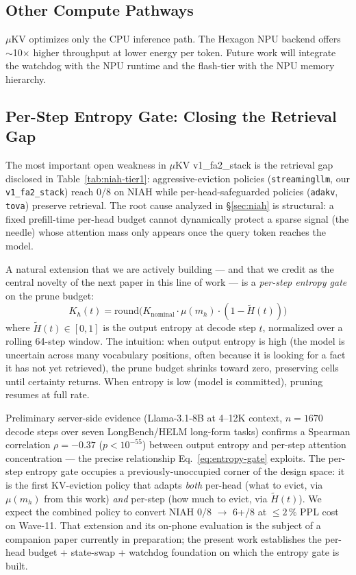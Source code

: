 \documentclass[sigconf, anonymous=false, screen=true]{acmart}
\begin{document}
\subsection{Other Compute Pathways}
\textsc{$\mu$KV} optimizes only the CPU inference path. The Hexagon NPU backend offers $\sim$10$\times$ higher throughput at lower energy per token. Future work will integrate the watchdog with the NPU runtime and the flash-tier with the NPU memory hierarchy.

\subsection{Per-Step Entropy Gate: Closing the Retrieval Gap}
\label{sec:future-entropy}

The most important open weakness in \textsc{$\mu$KV} v1\_fa2\_stack is the retrieval gap disclosed in Table~\ref{tab:niah-tier1}: aggressive-eviction policies (\texttt{streamingllm}, our \texttt{v1\_fa2\_stack}) reach 0/8 on NIAH while per-head-safeguarded policies (\texttt{adakv}, \texttt{tova}) preserve retrieval. The root cause analyzed in \S\ref{sec:niah} is structural: a fixed prefill-time per-head budget cannot dynamically protect a sparse signal (the needle) whose attention mass only appears once the query token reaches the model.

A natural extension that we are actively building --- and that we credit as the central novelty of the next paper in this line of work --- is a \emph{per-step entropy gate} on the prune budget:
\begin{equation}
K_h(t) = \mathrm{round}\bigl(K_{\text{nominal}} \cdot \mu(m_h) \cdot (1 - \tilde{H}(t))\bigr)
\label{eq:entropy-gate}
\end{equation}
where $\tilde{H}(t) \in [0, 1]$ is the output entropy at decode step $t$, normalized over a rolling 64-step window. The intuition: when output entropy is high (the model is uncertain across many vocabulary positions, often because it is looking for a fact it has not yet retrieved), the prune budget shrinks toward zero, preserving cells until certainty returns. When entropy is low (model is committed), pruning resumes at full rate.

Preliminary server-side evidence (Llama-3.1-8B at 4--12K context, $n{=}1670$ decode steps over seven LongBench/HELM long-form tasks) confirms a Spearman correlation $\rho = -0.37$ ($p < 10^{-55}$) between output entropy and per-step attention concentration --- the precise relationship Eq.~\ref{eq:entropy-gate} exploits. The per-step entropy gate occupies a previously-unoccupied corner of the design space: it is the first KV-eviction policy that adapts \emph{both} per-head (what to evict, via $\mu(m_h)$ from this work) \emph{and} per-step (how much to evict, via $\tilde{H}(t)$). We expect the combined policy to convert NIAH 0/8 $\to$ 6+/8 at $\le 2\,\%$ PPL cost on Wave-11. That extension and its on-phone evaluation is the subject of a companion paper currently in preparation; the present work establishes the per-head budget + state-swap + watchdog foundation on which the entropy gate is built.
\end{document}

